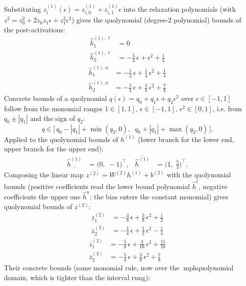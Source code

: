 \documentclass[11pt]{article}
\begin{document}
Substituting $z^{(1)}_i(\epsilon) = z^{(1)}_{i,0} + z^{(1)}_{i,1} \epsilon$ into the relaxation
polynomials (with $z^2 = z_0^2 + 2 z_0 z_1 \epsilon + z_1^2 \epsilon^2$) gives the quolynomial
(degree-2 polynomial) bounds of the post-activations:
\begin{align*}
\hat{h}^{(1),\ell}_{1} &= 0 \\
\hat{h}^{(1),\ell}_{2} &= -\frac{5}{4}\,\epsilon + \epsilon^2 + \frac{1}{4}
\end{align*}
\begin{align*}
\hat{h}^{(1),u}_{1} &= -\frac{1}{2}\,\epsilon + \frac{1}{4}\,\epsilon^2 + \frac{1}{4} \\
\hat{h}^{(1),u}_{2} &= -\frac{5}{4}\,\epsilon + \frac{3}{8}\,\epsilon^2 + \frac{7}{8}
\end{align*}
Concrete bounds of a quolynomial $q(\epsilon) = q_0 + q_1 \epsilon + q_2 \epsilon^2$ over
$\epsilon \in [-1, 1]$ follow from the monomial ranges $1 \in [1, 1]$, $\epsilon \in [-1, 1]$,
$\epsilon^2 \in [0, 1]$, i.e. from $q_0 \pm |q_1|$ and the sign of $q_2$:
\begin{equation*}
q \in \bigl[\, q_0 - |q_1| + \min(q_2, 0), \;\; q_0 + |q_1| + \max(q_2, 0) \,\bigr].
\end{equation*}
Applied to the quolynomial bounds of $h^{(1)}$ (lower branch for the lower end, upper branch for the upper end):
\begin{align*}
\underline{\hat{h}^{(1)}} &= \bigl(0,\; -1\bigr)^{\!\top}, & \overline{\hat{h}^{(1)}} &= \bigl(1,\; \frac{5}{2}\bigr)^{\!\top}.
\end{align*}
Composing the linear map $z^{(2)} = W^{(2)} h^{(1)} + b^{(2)}$ with the quolynomial bounds
(positive coefficients read the lower bound polynomial $\hat{h}^{\ell}$, negative coefficients the
upper one $\hat{h}^{u}$; the bias enters the constant monomial) gives quolynomial bounds of
$z^{(2)}$:
\begin{align*}
\underline{z}^{(2)}_{1} &= -\frac{3}{8}\,\epsilon + \frac{3}{8}\,\epsilon^2 + \frac{1}{2} \\
\underline{z}^{(2)}_{2} &= -\frac{1}{4}\,\epsilon + \frac{1}{2}\,\epsilon^2 - \frac{1}{4}
\end{align*}
\begin{align*}
\overline{z}^{(2)}_{1} &= -\frac{5}{8}\,\epsilon + \frac{3}{16}\,\epsilon^2 + \frac{15}{16} \\
\overline{z}^{(2)}_{2} &= -\frac{5}{4}\,\epsilon + \frac{3}{8}\,\epsilon^2 + \frac{7}{8}
\end{align*}
Their concrete bounds (same monomial rule, now over the mph{quolynomial} domain, which is tighter than the interval rung):
\end{document}
